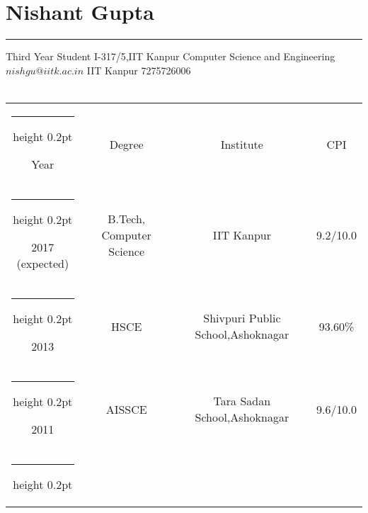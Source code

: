 \documentclass[a4paper]{article}
\author{Nishant Gupta}
\begin{document}

\section*{\textbf\Huge Nishant Gupta}
\hrule
\vspace{2mm}
Third Year Student  \hfill {I-317/5,IIT Kanpur} \newline
Computer Science and Engineering \hfill ${nishgu@iitk.ac.in}$ \newline
IIT Kanpur \hfill  {7275726006} \\ \\

\makeatletter
\newcommand{\thickhline}{%
    \noalign {\ifnum 0=`}\fi \hrule height 1pt
    \futurelet \reserved@a \@xhline
}

\makeatletter
\newcommand{\thinhline}{%
    \noalign {\ifnum 0=`}\fi \hrule height 0.2pt
    \futurelet \reserved@a \@xhline
}


\begin{center}
  \begin{tabular}{|c|c|c|c|} 
    \thinhline
    {\centering Year} & {\centering Degree} & {\centering Institute} & {\centering CPI} \\  
    \thinhline
    2017 (expected) & {B.Tech,  Computer Science} & IIT Kanpur  & 9.2/10.0  \\ 
    \thinhline
    2013 & {HSCE} & Shivpuri Public School,Ashoknagar & 			93.60\%	\\
    \thinhline
    2011 & AISSCE & Tara Sadan School,Ashoknagar  & 9.6/10.0   \\
    \thinhline

  \end{tabular}
\end{center}
\end{document}
